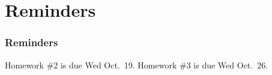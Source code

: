 \documentclass[11pt]{beamer}
\begin{document}
\section{Reminders}

\begin{frame}
  \frametitle{Reminders}
  \Enlarge

  \begin{itemize}
  \myitem  Homework \#2 is due Wed Oct.\ 19.
  \myitem  Homework \#3 is due Wed Oct.\ 26.
  \end{itemize}
\end{frame}
\end{document}
